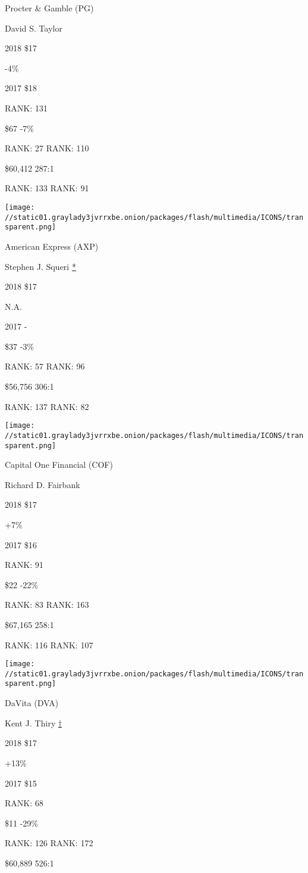 Procter \& Gamble (PG)

David S. Taylor \protect\hyperlink{g-footnotes}{}

2018 \$17

 -4\%

2017 \$18

RANK: 131

 \$67 -7\%

RANK: 27 RANK: 110

 \$60,412 287:1

RANK: 133 RANK: 91

\texttt{[image: //static01.graylady3jvrrxbe.onion/packages/flash/multimedia/ICONS/transparent.png]}

American Express (AXP)

Stephen J. Squeri \protect\hyperlink{g-footnotes}{*}

2018 \$17

 N.A.

2017 -

 \$37 -3\%

RANK: 57 RANK: 96

 \$56,756 306:1

RANK: 137 RANK: 82

\texttt{[image: //static01.graylady3jvrrxbe.onion/packages/flash/multimedia/ICONS/transparent.png]}

Capital One Financial (COF)

Richard D. Fairbank \protect\hyperlink{g-footnotes}{}

2018 \$17

 +7\%

2017 \$16

RANK: 91

 \$22 -22\%

RANK: 83 RANK: 163

 \$67,165 258:1

RANK: 116 RANK: 107

\texttt{[image: //static01.graylady3jvrrxbe.onion/packages/flash/multimedia/ICONS/transparent.png]}

DaVita (DVA)

Kent J. Thiry \protect\hyperlink{g-footnotes}{†}

2018 \$17

 +13\%

2017 \$15

RANK: 68

 \$11 -29\%

RANK: 126 RANK: 172

 \$60,889 526:1

